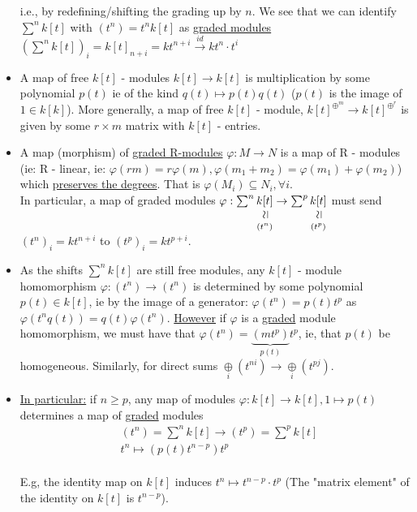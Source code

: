 \documentclass[11pt,a4paper]{report}
\newcommand{\vertsimeq}{\rotatebox{90}{$\,\simeq$}}
\newcommand{\simequalto}[2]{\underset{\scriptstyle\overset{\mkern4mu\vertsimeq}{#2}}{#1}}
\begin{document}
\begin{itemize}
              i.e., by redefining/shifting the grading up by $n$. We see that we can identify $\sum^nk[t]$ with $(t^n) = t^nk[t]$ as \underline{graded modules} $(\sum^nk[t])_i = k[t]_{n+i} = kt^{n+i} \xrightarrow{id} kt^n\cdot t^i$\\
              \item
              A map of free $k[t]$ - modules $k[t] \rightarrow k[t]$ is multiplication by some polynomial $p(t)$ ie of the kind $q(t) \mapsto p(t)q(t)$ ($p(t)$ is the image of $1 \in k[k]$). More generally, a map of free $k[t]$ - module, $k[t]^{\oplus^{m}} \rightarrow k[t]^{\oplus^{r}}$ is given by some $r \times m$ matrix with $k[t]$ - entries.\\
              \item
              A map (morphism) of \underline{graded R-modules} $\varphi: M \rightarrow N$ is a map of R - modules (ie: R - linear, ie: $\varphi(rm) = r \varphi(m), \varphi(m_1 + m_2) = \varphi(m_1) + \varphi(m_2)$) which \underline{preserves the degrees}. That is $\varphi(M_i) \subseteq N_i, \forall i$.\\
              In particular, a map of graded modules $\varphi: \sum^n\simequalto{k[t]}{(t^n)} \rightarrow \sum^p\simequalto{k[t]}{(t^p)}$ must send $(t^n)_i = kt^{n+i}$ to $(t^p)_i = kt^{p+i}$.\\
              \item
              As the shifts $\sum^nk[t]$ are still free modules, any $k[t]$ - module homomorphism $\varphi: (t^n) \rightarrow (t^n)$ is determined by some polynomial $p(t) \in k[t]$, ie by the image of a generator: $\varphi(t^n) = p(t)t^p$ as $\varphi(t^nq(t)) = q(t)\varphi(t^n)$. \underline{However} if $\varphi$ is a \underline{graded} module homomorphism, we must have that $\varphi(t^n) = \underbrace{(mt^p)}_{p(t)}t^p$, ie, that $p(t)$ be homogeneous. Similarly, for direct sums $\underset{i}{\oplus}(t^{ni}) \rightarrow \underset{i}{\oplus}(t^{pj})$.\\
              \item
              \underline{In particular:} if $n \ge p$, any map of modules $\varphi: k[t] \rightarrow k[t], 1 \mapsto p(t)$ determines a map of \underline{graded} modules
              \begin{align*}
                &(t^n) = \sum^nk[t] \rightarrow (t^p) = \sum^pk[t]\\
                &t^n \mapsto (p(t)t^{n-p})t^p
              \end{align*}
              \\
              E.g, the identity map on $k[t]$ induces $t^n \mapsto t^{n-p} \cdot t^p$ (The "matrix element" of the identity on $k[t]$ is $t^{n-p}$).
              \end{itemize}
\end{document}
